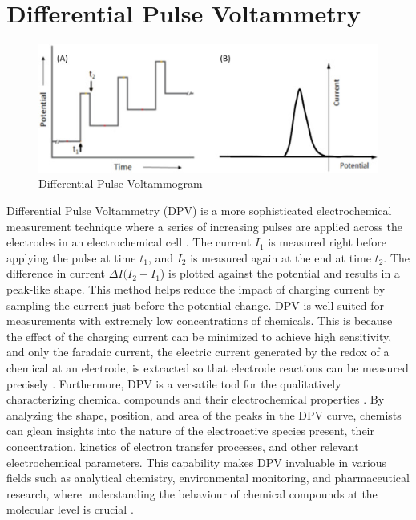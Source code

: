 \section{Differential Pulse Voltammetry}
\begin{figure}[h!]
  \centering
    \includegraphics[width=1.0\textwidth]{figures/dpv.jpg}
    \caption{Differential Pulse Voltammogram}
    \label{dpv_example}
\end{figure}
Differential Pulse Voltammetry (DPV) is a more sophisticated electrochemical measurement technique where a series of increasing pulses are applied across the electrodes in an electrochemical cell \cite{Scholz2005-pa}. The current $I_1$ is measured right before applying the pulse at time $t_1$, and $I_2$ is measured again at the end at time $t_2$. The difference in current $\Delta I(I_2 - I_1$) is plotted against the potential and results in a peak-like shape. 
This method helps reduce the impact of charging current by sampling the current just before the potential change. DPV is well suited for measurements with extremely low concentrations of chemicals. This is because the effect of the charging current can be minimized to achieve high sensitivity, and only the faradaic current, the electric current generated by the redox of a chemical at an electrode, is extracted so that electrode reactions can be measured precisely \cite{Laborda2014}. Furthermore, DPV is a versatile tool for the qualitatively characterizing chemical compounds and their electrochemical properties \cite{Scholz2005-pa}. By analyzing the shape, position, and area of the peaks in the DPV curve, chemists can glean insights into the nature of the electroactive species present, their concentration, kinetics of electron transfer processes, and other relevant electrochemical parameters. This capability makes DPV invaluable in various fields such as analytical chemistry, environmental monitoring, and pharmaceutical research, where understanding the behaviour of chemical compounds at the molecular level is crucial \cite{Scholz2005-pa}.